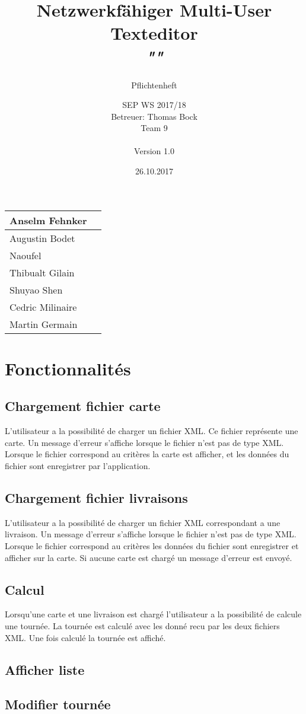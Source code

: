 \documentclass{scrartcl}
\title{Netzwerkfähiger Multi-User Texteditor\\
\textit{"\name"}}
\subtitle{Pflichtenheft}
\author{SEP WS 2017/18\\
Betreuer: Thomas Bock\\
Team 9\\ \\
Version 1.0}
\date{26.10.2017}
\begin{document}
\maketitle

\iffalse
\begin{figure}[h]
	\centering
  \texttt{[image: ../img/insta\_logo]}
	\label{fig:logo}
\end{figure}
\fi
\vfill

\begin{center}
  \begin{tabular}{ | l | r | }
    \hline
    Anselm Fehnker \\ \hline
    Augustin Bodet  \\ \hline
    Naoufel \\ \hline
    Thibualt Gilain \\ \hline
    Shuyao Shen \\ \hline
    Cedric Milinaire\\ \hline
    Martin Germain \\ \hline
  \end{tabular}
\end{center}

\thispagestyle{empty}
\pagebreak
\renewcommand{\contentsname}{Table des matières}
\tableofcontents
\newpage

\section{Fonctionnalités}
\subsection{Chargement fichier carte}
L'utilisateur a la possibilité de charger un fichier XML. Ce fichier représente une carte. Un message d'erreur s'affiche lorsque le fichier n'est pas de type XML. Lorsque le fichier correspond au critères la carte est afficher, et les données du fichier sont enregistrer par l'application. 
\subsection{Chargement fichier livraisons}
L'utilisateur a la possibilité de charger un fichier XML correspondant a une livraison. Un message d'erreur s'affiche lorsque le fichier n'est pas de type XML. Lorsque le fichier correspond au critères les données du fichier sont enregistrer et afficher sur la carte. Si aucune carte est chargé un message d'erreur est envoyé. 
\subsection{Calcul}
Lorsqu'une carte et une livraison est chargé l'utilisateur a la possibilité de calcule une tournée. La tournée est calculé avec les donné recu par les deux fichiers XML. Une fois calculé la tournée est affiché. 
\subsection{Afficher liste}

\subsection{Modifier tournée}
\end{document}
